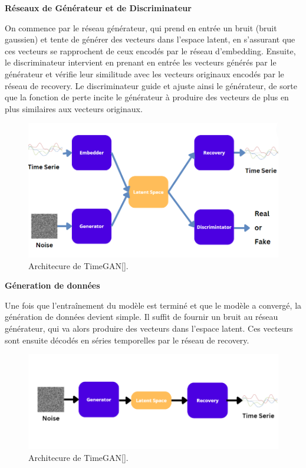 \textbf{Réseaux de Générateur et de Discriminateur}

On commence par le réseau générateur, qui prend en entrée un bruit (bruit
gaussien) et tente de générer des vecteurs dans l'espace latent, en s'assurant
que ces vecteurs se rapprochent de ceux encodés par le réseau d'embedding.
Ensuite, le discriminateur intervient en prenant en entrée les vecteurs générés
par le générateur et vérifie leur similitude avec les vecteurs originaux
encodés par le réseau de recovery. Le discriminateur guide et ajuste ainsi le
générateur, de sorte que la fonction de perte incite le générateur à produire
des vecteurs de plus en plus similaires aux vecteurs originaux.

\begin{figure}[hbt!]
  \centering
  \includegraphics[width=14cm]{images_pfe/timegan_archi_.png}
  \caption{Architecure de TimeGAN[\cite{yoon2019time}].}
  \label{fig:timegan}
\end{figure}
\FloatBarrier

\textbf{Géneration de données}

Une fois que l'entraînement du modèle est terminé et que le modèle a convergé,
la génération de données devient simple. Il suffit de fournir un bruit au
réseau générateur, qui va alors produire des vecteurs dans l'espace latent. Ces
vecteurs sont ensuite décodés en séries temporelles par le réseau de recovery.

\begin{figure}[hbt!]
  \centering
  \includegraphics[width=14cm]{images_pfe/gents.png}
  \caption{Architecure de TimeGAN[\cite{yoon2019time}].}
  \label{fig:timegan}
\end{figure}
\FloatBarrier

